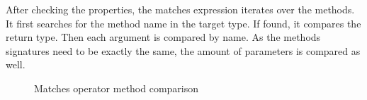 After checking the properties, the matches expression iterates over the methods. It first searches for the method name in the target type. If found, it compares the return type. Then each argument is compared by name. As the methods signatures need to be exactly the same, the amount of parameters is compared as well.

\begin{figure}[h!]
	\centering
	\def\stackalignment{r}
	\caption{Matches operator method comparison}
	\label{fig:implementation:matchesmethod}
\end{figure}

